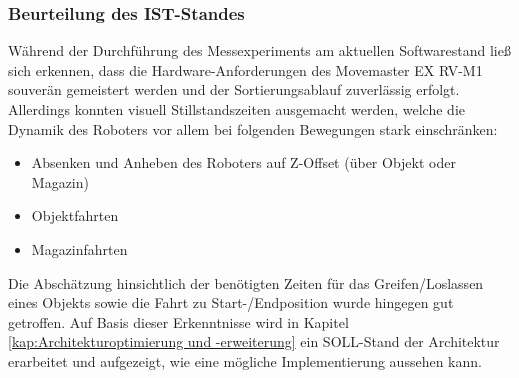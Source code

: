 \subsubsection*{Beurteilung des IST-Standes}
Während der Durchführung des Messexperiments am aktuellen Softwarestand ließ sich erkennen, dass die Hardware-Anforderungen des Movemaster EX RV-M1 souverän gemeistert werden und der Sortierungsablauf zuverlässig erfolgt. Allerdings konnten visuell Stillstandszeiten ausgemacht werden, welche die Dynamik des Roboters vor allem bei folgenden Bewegungen stark einschränken:
\begin{itemize}
	\item Absenken und Anheben des Roboters auf Z-Offset (über Objekt oder Magazin)
	\item Objektfahrten
	\item Magazinfahrten
\end{itemize}
 Die Abschätzung hinsichtlich der benötigten Zeiten für das Greifen/Loslassen eines Objekts sowie die Fahrt zu Start-/Endposition wurde hingegen gut getroffen. Auf Basis dieser Erkenntnisse wird in Kapitel \ref{kap:Architekturoptimierung und -erweiterung} ein SOLL-Stand der Architektur erarbeitet und aufgezeigt, wie eine mögliche Implementierung aussehen kann.


